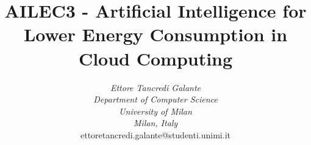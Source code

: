 \documentclass{article}
\begin{document}
\title{AILEC3 - Artificial Intelligence for Lower Energy Consumption in Cloud Computing}

\author{
\textit{Ettore Tancredi Galante} \\
\textit{Department of Computer Science} \\
\textit{University of Milan} \\
\textit{Milan, Italy} \\
ettoretancredi.galante@studenti.unimi.it
}


\maketitle
\newpage
\tableofcontents
\newpage



%

%





%
%
%



\end{document}
